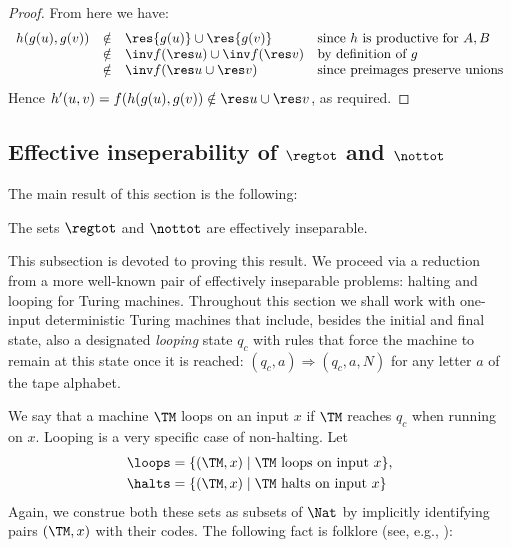\begin{proof}
From here we have:
\[
\begin{array}{rcll}
     h(g(u),g(v)) & \notin & \res{g(u)} \cup \res{g(v)} & \text{since $h$ is productive for $A,B$} \\
        & \notin & \inv f (\res u) \cup \inv f (\res v) & \text{by definition of $g$} \\
        & \notin & \inv f (\res u \cup \res v) & \text{since preimages preserve unions}
\end{array}
\]
% 
Hence $h'(u,v) = f(h(g(u), g(v)) \notin  \res u \cup \res v$, as required.
\end{proof}



\subsection{Effective inseperability of $\regtot$ and $\nottot $}

The main result of this section is the following:

\begin{theorem}
\label{regtot-nottot-eff-insep}
The sets $\regtot$ and $\nottot$ are effectively inseparable.
\end{theorem}
This subsection is devoted to proving this result.
We proceed via a reduction from a more well-known pair of effectively inseparable problems: halting and looping for Turing machines. 
% 
Throughout this section we shall work with one-input deterministic Turing machines that include, besides the initial and final state, also a designated {\em looping} state $q_c$ with rules that force the machine to remain at this state once it is reached: $(q_c, a) \Rightarrow (q_c, a, N)$ for any letter $a$ of the tape alphabet.

We say that a machine $\TM$ loops on an input $x$ if $\TM$ reaches $q_c$ when running on $x$. Looping is a very specific case of non-halting. Let 
\begin{align*}
& \loops = \{ (\TM,x) \mid \mbox{$\TM$ loops on input $x$} \}, \\
& \halts = \{ (\TM,x) \mid \mbox{$\TM$ halts on input $x$} \}
\end{align*}
Again, we construe both these sets as subsets of $\Nat$ by implicitly identifying pairs $(\TM,x)$ with their codes.
The following fact is folklore (see, e.g., \cite[Exercise 7-55d]{Rogers1987}\cite[Proposition 3]{Kuznetsov2021TOCL}):

